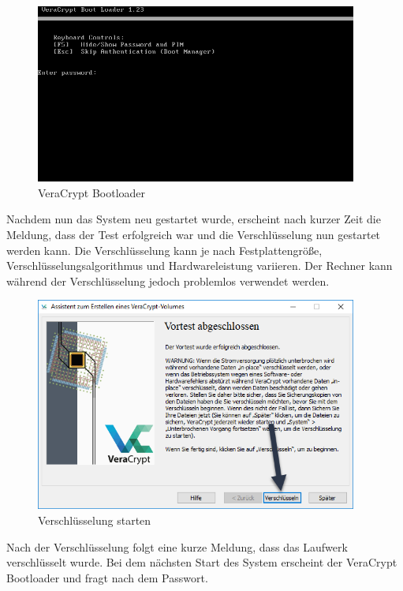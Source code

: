 \documentclass[12pt,a4paper]{scrreprt}
\begin{document}
\begin{figure}[h]
\begin{center}
\includegraphics[width=300pt]{media/bootloader.png}
\caption{VeraCrypt Bootloader}
\label{bootloader}
\end{center}
\end{figure}

\newpage

\noindent Nachdem nun das System neu gestartet wurde, erscheint nach kurzer Zeit die Meldung, dass der Test erfolgreich war und die Verschlüsselung nun gestartet werden kann. Die Verschlüsselung kann je nach Festplattengröße, Verschlüsselungsalgorithmus und Hardwareleistung variieren. Der Rechner kann während der Verschlüsselung jedoch problemlos verwendet werden.

\begin{figure}[h]
\begin{center}
\includegraphics[width=300pt]{media/startencryption.png}
\caption{Verschlüsselung starten}
\label{startencryption}
\end{center}
\end{figure}

\noindent Nach der Verschlüsselung folgt eine kurze Meldung, dass das Laufwerk verschlüsselt wurde. Bei dem nächsten Start des System erscheint der VeraCrypt Bootloader und fragt nach dem Passwort.
\end{document}
